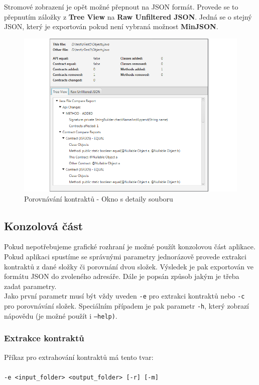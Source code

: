 		Stromové zobrazení je opět možné přepnout na JSON formát. Provede se to přepnutím záložky z \textbf{Tree View} na \textbf{Raw Unfiltered JSON}. Jedná se o stejný JSON, který je exportován pokud není vybraná možnost \textbf{MinJSON}.
		
			\begin{figure}[!htb]
					\centering
					\includegraphics[width=1\textwidth]{img/guide07.png}
					\caption[guide07]{Porovnávání kontraktů - Okno s detaily souboru}
					\label{guide07}
				\endminipage\hfill
			\end{figure}		
		
	\subsection{Konzolová část}
		Pokud nepotřebujeme grafické rozhraní je možné použít konzolovou část aplikace. Pokud aplikaci spustíme se správnými parametry jednorázově provede extrakci kontraktů z dané složky či porovnání dvou složek. Výsledek je pak exportován ve formátu JSON do zvoleného adresáře. Dále je popsán způsob jakým je třeba zadat parametry.\\
		
		Jako první parametr musí být vždy uveden \texttt{-e} pro extrakci kontraktů nebo \texttt{-c} pro porovnávání složek. Speciálním případem je pak parametr \texttt{-h}, který zobrazí nápovědu (je možné použít i \texttt{---help)}.
		
		\subsubsection{Extrakce kontraktů}
			Příkaz pro extrahování kontraktů má tento tvar:\\\\
			\- \- \- \texttt{-e <input\_folder> <output\_folder> [-r] [-m]}\\
			
